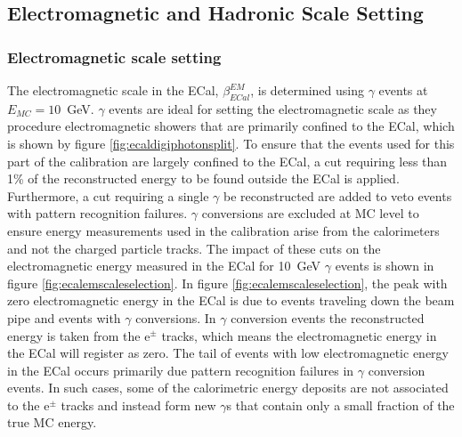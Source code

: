 
\subsection{Electromagnetic and Hadronic Scale Setting}
\label{sec:scalesetting}


\subsubsection{Electromagnetic scale setting}
\label{sec:emscalesetting}
The electromagnetic scale in the ECal, $\beta^{EM}_{ECal}$, is determined using $\gamma$ events at $E_{MC} = 10$~GeV.  $\gamma$ events are ideal for setting the electromagnetic scale as they procedure electromagnetic showers that are primarily confined to the ECal, which is shown by figure \ref{fig:ecaldigiphotonsplit}.  To ensure that the events used for this part of the calibration are largely confined to the ECal, a cut requiring less than 1\% of the reconstructed energy to be found outside the ECal is applied.  Furthermore, a cut requiring a single $\gamma$ be reconstructed are added to veto events with pattern recognition failures.  $\gamma$ conversions are excluded at MC level to ensure energy measurements used in the calibration arise from the calorimeters and not the charged particle tracks.  The impact of these cuts on the electromagnetic energy measured in the ECal for 10~GeV $\gamma$ events is shown in figure \ref{fig:ecalemscaleselection}.  In figure \ref{fig:ecalemscaleselection}, the peak with zero electromagnetic energy in the ECal is due to events traveling down the beam pipe and events with $\gamma$ conversions.  In $\gamma$ conversion events the reconstructed energy is taken from the $\text{e}^{\pm}$ tracks, which means the electromagnetic energy in the ECal will register as zero.  The tail of events with low electromagnetic energy in the ECal occurs primarily due pattern recognition failures in $\gamma$ conversion events.  In such cases, some of the calorimetric energy deposits are not associated to the $\text{e}^{\pm}$ tracks and instead form new $\gamma$s that contain only a small fraction of the true MC energy.  

